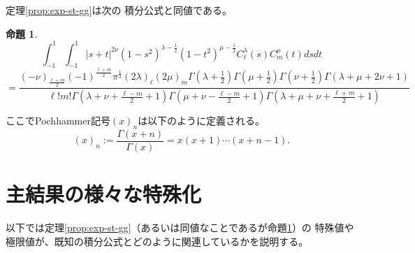 \documentclass[12pt,a4paper,dvipdfmx]{jsarticle}
\numberwithin{equation}{section}
\theoremstyle{jplain}
\newtheorem{prop}[thm]{命題}
\theoremstyle{remark}
\newtheorem*{remark*}{注意}
\theoremstyle{definition}
\begin{document}
	定理\ref{prop:exp-st-gg}は次の
	積分公式と同値である。
	\begin{prop}
		\label{prop:int-st-gg}
		\begin{equation*}
			\int_{- 1}^1 \int_{- 1}^1 | s + t |^{2 \nu} (1 - s^2)^{\lambda - \frac{1}{2}}
			(1 - t^2)^{\mu - \frac{1}{2}} C_\ell^{\lambda} (s) C_m^{\mu} (t) d s d t
		\end{equation*}
		{
		\begin{equation}
			=\frac{(- \nu)_{\frac{\ell + m}{2}} (- 1)^{\frac{\ell + m}{2}} \pi^{\frac{1}{2}} (2
			\lambda)_\ell (2 \mu)_m \Gamma \left( \lambda + \frac{1}{2} \right) \Gamma \left(
			\mu + \frac{1}{2} \right) \Gamma \left( \nu + \frac{1}{2} \right) \Gamma
		(\lambda + \mu + 2 \nu + 1)}{\ell!m! \Gamma \left( \lambda + \nu + \frac{\ell -
		m}{2} + 1 \right) \Gamma \left( \mu + \nu - \frac{\ell - m}{2} + 1 \right) \Gamma
		\left( \lambda + \mu + \nu + \frac{\ell + m}{2} + 1 \right)}
			\label{eqn:int-st-gg}
		\end{equation}
		}
	\end{prop}
	ここでPochhammer記号$(x)_n$は以下のように定義される。\begin{equation*}
		(x)_n:=\frac{\Gamma(x+n)}{\Gamma(x)}=x(x+1)\cdots(x+n-1).
	\end{equation*}
\section{主結果の様々な特殊化}
以下では定理\ref{prop:exp-st-gg}（あるいは同値なことであるが命題\ref{prop:int-st-gg}）の
特殊値や極限値が、{既知}の積分公式とどのように関連しているかを説明する。
\end{document}
